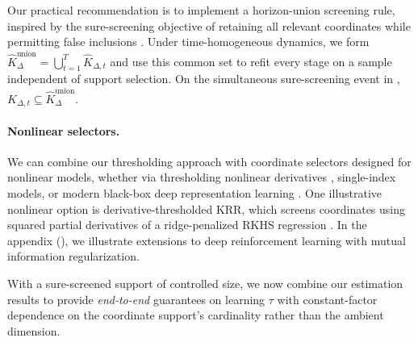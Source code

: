 \documentclass[opre,nonblindrev]{informs4}
\newenvironment{revision}{\begingroup\color{revisionblue}\ignorespaces}{\endgroup}
\newcommand{\blipadv}{\tau}
\begin{document}
\begin{revision}
\begin{remark}
Our practical recommendation is to implement a horizon-union screening rule, inspired by the sure-screening objective of retaining all relevant
coordinates while permitting false inclusions \citep{fan2008sure}. Under time-homogeneous dynamics, we form
$\hat K_{\Delta}^{\mathrm{union}}=\bigcup_{t=1}^T\hat K_{\Delta,t}$ and use
this common set to refit every stage on a sample independent of support
selection. On the simultaneous
sure-screening event in ,
$K_{\Delta,t}\subseteq\hat K_{\Delta}^{\mathrm{union}}$.
\end{remark}

\paragraph{Nonlinear selectors.}
We can combine our thresholding approach with coordinate selectors designed for nonlinear models, whether via thresholding nonlinear derivatives \citep{he2021efficient}, single-index models, or modern black-box deep representation learning \citep{liu2023}. 
One illustrative nonlinear option is derivative-thresholded KRR, which screens
coordinates using squared partial derivatives of a ridge-penalized RKHS
regression \citep{he2021efficient}. In the appendix (), we illustrate extensions to deep reinforcement learning with mutual information regularization.

With a sure-screened support of controlled size, we now combine
our estimation results to provide \textit{end-to-end} guarantees on learning
$\blipadv$ with
constant-factor dependence on the coordinate support's cardinality rather
than the ambient dimension.


\end{revision}
\end{document}
